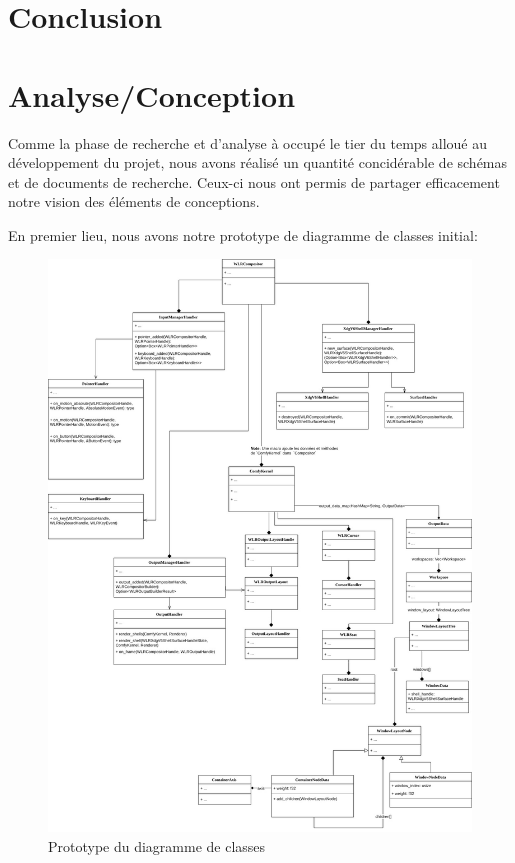 \documentclass[titlepage]{article}
\begin{document}
\section{Conclusion}

\section{Analyse/Conception}
\par
Comme la phase de recherche et d'analyse à occupé le tier du temps alloué au développement du projet, nous avons réalisé un quantité concidérable de schémas et de documents de recherche. Ceux-ci nous ont permis de partager efficacement notre vision des éléments de conceptions.
\bigskip

\par
En premier lieu, nous avons notre prototype de diagramme de classes initial:
\bigskip

\begin{figure}[H]
	\centering
	\includegraphics[width=\textwidth]{Diagramme_de_classes.jpg}
	\caption{Prototype du diagramme de classes}
\end{figure}
\end{document}
